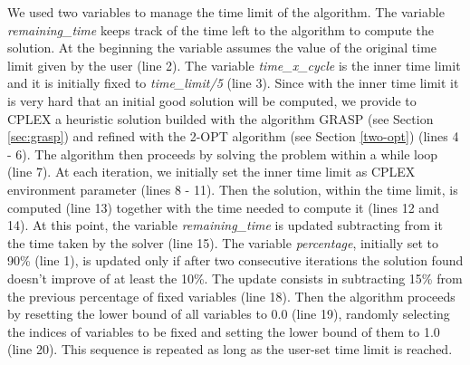 We used two variables to manage the time limit of the algorithm. The variable \textit{remaining\_time} keeps track of the time left to the algorithm to compute the solution. At the beginning the variable assumes the value of the original time limit given by the user (line 2). The variable \textit{time\_x\_cycle} is the inner time limit and it is initially fixed to \textit{time\_limit/5} (line 3). Since with the inner time limit it is very hard that an initial good solution will be computed, we provide to CPLEX a heuristic solution builded with the algorithm GRASP (see Section \ref{sec:grasp}) and refined with the 2-OPT algorithm (see Section \ref{two-opt}) (lines 4 - 6).
The algorithm then proceeds by solving the problem within a while loop (line 7). At each iteration, we initially set the inner time limit as CPLEX environment parameter (lines 8 - 11). 
Then the solution, within the time limit, is computed (line 13) together with the time needed to compute it (lines 12 and 14).
At this point, the variable \textit{remaining\_time} is updated subtracting from it the time taken by the solver (line 15).
 The variable \textit{percentage}, initially set to 90\% (line 1), is updated only if after two consecutive iterations the solution found doesn't improve of at least the 10\%. The update consists in subtracting 15\% from the previous percentage of fixed variables (line 18). Then the algorithm proceeds by resetting the lower bound of all variables to 0.0 (line 19), randomly selecting the indices of variables to be fixed and setting the lower bound of them to 1.0 (line 20). This sequence is repeated as long as the user-set time limit is reached.

